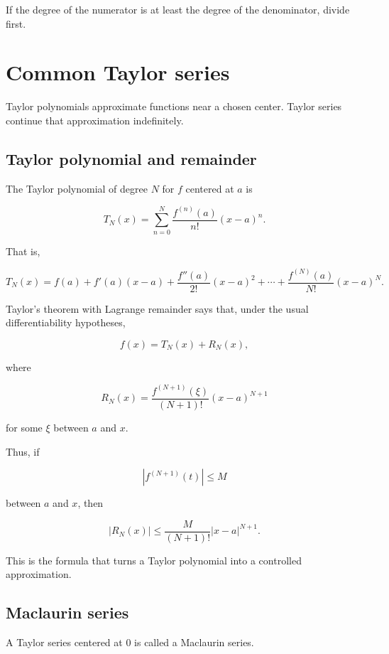 If the degree of the numerator is at least the degree of the denominator, divide first.

\section{Common Taylor series}
\label{appsec:common-taylor-series}

Taylor polynomials approximate functions near a chosen center.  Taylor series continue
that approximation indefinitely.

\subsection{Taylor polynomial and remainder}
\label{appsubsec:taylor-polynomial-remainder-table}

The Taylor polynomial of degree \(N\) for \(f\) centered at \(a\) is

\[
\boxed{
T_N(x)
=
\sum_{n=0}^{N}\frac{f^{(n)}(a)}{n!}(x-a)^n.
}
\]

That is,

\[
T_N(x)
=
f(a)+f'(a)(x-a)+\frac{f''(a)}{2!}(x-a)^2+\cdots+
\frac{f^{(N)}(a)}{N!}(x-a)^N.
\]

Taylor's theorem with Lagrange remainder says that, under the usual differentiability
hypotheses,

\[
\boxed{
f(x)=T_N(x)+R_N(x),
}
\]

where

\[
\boxed{
R_N(x)
=
\frac{f^{(N+1)}(\xi)}{(N+1)!}(x-a)^{N+1}
}
\]

for some \(\xi\) between \(a\) and \(x\).

Thus, if

\[
|f^{(N+1)}(t)|\le M
\]

between \(a\) and \(x\), then

\[
\boxed{
|R_N(x)|\le
\frac{M}{(N+1)!}|x-a|^{N+1}.
}
\]

This is the formula that turns a Taylor polynomial into a controlled approximation.

\subsection{Maclaurin series}
\label{appsubsec:maclaurin-series-table}

A Taylor series centered at \(0\) is called a Maclaurin series.

